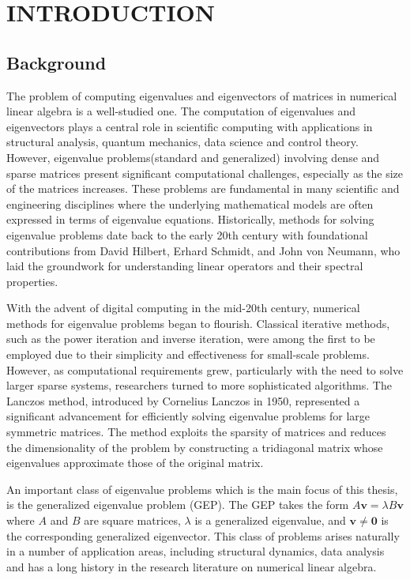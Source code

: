 \chapter{INTRODUCTION}
\newtheorem{theorem}{Theorem}[section]
\newtheorem{definition}{Definition}[section]

\section{Background}\label{sec:Background}

The problem of computing eigenvalues and eigenvectors of matrices in numerical linear algebra is a well-studied one. The computation of eigenvalues and eigenvectors plays a central role in scientific computing with applications in structural analysis, quantum mechanics, data science and control theory. However, eigenvalue problems(standard and generalized)  involving dense and sparse matrices present significant computational challenges, especially as the size of the matrices increases. These problems are fundamental in many scientific and engineering disciplines where the underlying mathematical models are often expressed in terms of eigenvalue equations. Historically, methods for solving eigenvalue problems date back to the early 20th century with foundational contributions from David Hilbert, Erhard Schmidt, and John von Neumann, who laid the groundwork for understanding linear operators and their spectral properties.

With the advent of digital computing in the mid-20th century, numerical methods for eigenvalue problems began to flourish. Classical iterative methods, such as the power iteration and inverse iteration, were among the first to be employed due to their simplicity and effectiveness for small-scale problems. However, as computational requirements grew, particularly with the need to solve larger sparse systems, researchers turned to more sophisticated algorithms. The Lanczos method, introduced by Cornelius Lanczos in 1950,
represented a significant advancement for efficiently solving eigenvalue problems for large symmetric matrices. The method exploits the sparsity of matrices and reduces the dimensionality of the problem by constructing a tridiagonal matrix whose eigenvalues approximate those of the original matrix.

An important class of eigenvalue problems which is the main focus of this thesis, is the generalized eigenvalue problem {} (GEP). The GEP takes the form $A\mathbf{v} = \lambda B\mathbf{v}$ where $A$ and $B$ are square matrices, $\lambda$ is a generalized eigenvalue, and $\mathbf{v}\neq\mathbf{0}$ is the corresponding generalized eigenvector. This class of problems arises naturally in a number of application areas, including structural dynamics, data analysis and has a long history in the research literature on numerical linear algebra.

